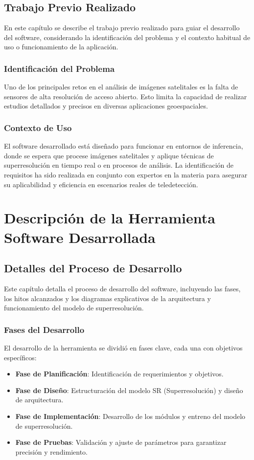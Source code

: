 \section{Trabajo Previo Realizado}
En este capítulo se describe el trabajo previo realizado para guiar el desarrollo del software, considerando la identificación del problema y el contexto habitual de uso o funcionamiento de la aplicación.

\subsection{Identificación del Problema}
Uno de los principales retos en el análisis de imágenes satelitales es la falta de sensores de alta resolución de acceso abierto. Esto limita la capacidad de realizar estudios detallados y precisos en diversas aplicaciones geoespaciales.

\subsection{Contexto de Uso}
El software desarrollado está diseñado para funcionar en entornos de inferencia, donde se espera que procese imágenes satelitales y aplique técnicas de superresolución en tiempo real o en procesos de análisis. La identificación de requisitos ha sido realizada en conjunto con expertos en la materia para asegurar su aplicabilidad y eficiencia en escenarios reales de teledetección.

\chapter{Descripción de la Herramienta Software Desarrollada}

\section{Detalles del Proceso de Desarrollo}
Este capítulo detalla el proceso de desarrollo del software, incluyendo las fases, los hitos alcanzados y los diagramas explicativos de la arquitectura y funcionamiento del modelo de superresolución.

\subsection{Fases del Desarrollo}
El desarrollo de la herramienta se dividió en fases clave, cada una con objetivos específicos:
\begin{itemize}
    \item \textbf{Fase de Planificación}: Identificación de requerimientos y objetivos.
    \item \textbf{Fase de Diseño}: Estructuración del modelo SR (Superresolución) y diseño de arquitectura.
    \item \textbf{Fase de Implementación}: Desarrollo de los módulos y entreno del modelo de superresolución.
    \item \textbf{Fase de Pruebas}: Validación y ajuste de parámetros para garantizar precisión y rendimiento.
\end{itemize}

